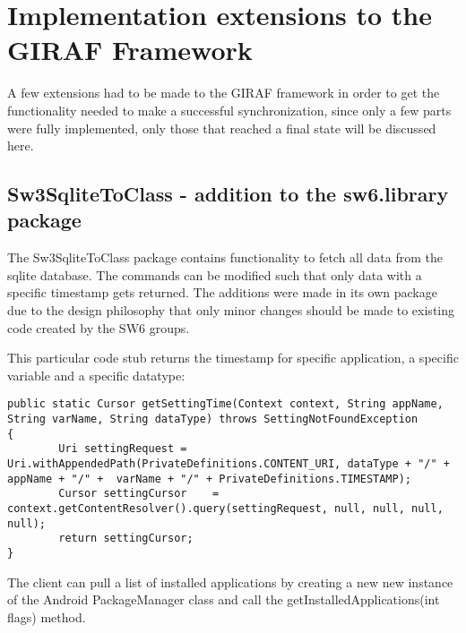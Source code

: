 \section{Implementation extensions to the GIRAF Framework}
A few extensions had to be made to the GIRAF framework in order to get the functionality needed to make a successful synchronization, since only a few parts were fully implemented, only those that reached a final state will be discussed here. 

\subsection{Sw3SqliteToClass - addition to the sw6.library package}
The Sw3SqliteToClass package contains functionality to fetch all data from the sqlite database. The commands can be modified such that only data with a specific timestamp gets returned. The additions were made in its own package due to the design philosophy that only minor changes should be made to existing code created by the SW6 groups.

This particular code stub returns the timestamp for specific application, a specific variable and a specific datatype:

\lstset{language=JAVA}
\begin{lstlisting}
public static Cursor getSettingTime(Context context, String appName, String varName, String dataType) throws SettingNotFoundException 
{
		Uri settingRequest = Uri.withAppendedPath(PrivateDefinitions.CONTENT_URI, dataType + "/" + appName + "/" +  varName + "/" + PrivateDefinitions.TIMESTAMP);
		Cursor settingCursor 	= context.getContentResolver().query(settingRequest, null, null, null, null);	
		return settingCursor;
}
\end{lstlisting}

The client can pull a list of installed applications by creating a new new instance of the Android PackageManager class and call the getInstalledApplications(int flags) method\cite{AndDevel2}. 


